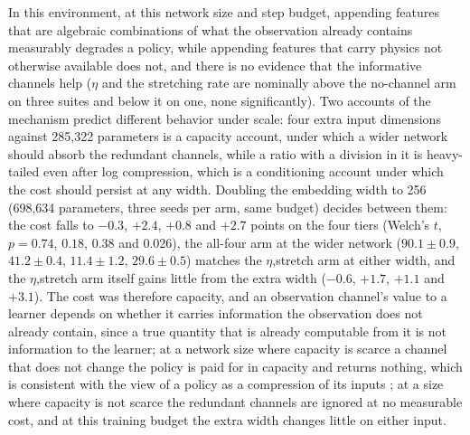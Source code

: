 In this environment, at this network size and step budget, appending
features that are algebraic combinations of what the observation already
contains measurably degrades a policy, while appending features that carry
physics not otherwise available does not, and there is no evidence that the
informative channels help ($\eta$ and the stretching rate are nominally
above the no-channel arm on three suites and below it on one, none
significantly). Two accounts of the mechanism predict different behavior
under scale: four extra input dimensions against 285,322 parameters is a
capacity account, under which a wider network should absorb the redundant
channels, while a ratio with a division in it is heavy-tailed even after log
compression, which is a conditioning account under which the cost should
persist at any width. Doubling the embedding width to 256 (698,634
parameters, three seeds per arm, same budget) decides between them: the
cost falls to $-0.3$, $+2.4$, $+0.8$ and $+2.7$ points on the four tiers
(Welch's $t$, $p = 0.74$, $0.18$, $0.38$ and $0.026$), the all-four arm at
the wider network ($90.1 \pm 0.9$, $41.2 \pm 0.4$, $11.4 \pm 1.2$,
$29.6 \pm 0.5$) matches the $\eta$,stretch arm at either width, and the
$\eta$,stretch arm itself gains little from the extra width ($-0.6$, $+1.7$,
$+1.1$ and $+3.1$). The cost was therefore capacity, and an observation channel's value to a
learner depends on whether it carries information the observation does not
already contain, since a true quantity that is already computable from it
is not information to the learner; at a network size where capacity is scarce a channel that does not
change the policy is paid for in capacity and returns nothing, which is
consistent with the view of a policy as a compression of its inputs
\cite{lai2024,kaelbling1998}; at a size where capacity is not scarce the redundant channels are ignored
at no measurable cost, and at this training budget the extra width changes
little on either input.
